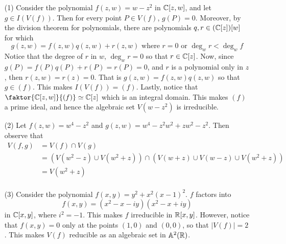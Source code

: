 \begin{example}\label{example_1.12}
    \begin{enumerate}
        \item[(1)] Consider the polynomial $f(z,w)=w-z^2$ in $\mathbb{C}[z,w]$, and let
            $g \in I(V(f))$. Then for every point $P \in V(f)$, $g(P)=0$.
            Moreover, by the division theorem for polynomials, there
            are polynomials $q,r \in
            (\mathbb{C}[z])[w]$ for which
            \begin{equation*}
                g(z,w)=f(z,w)q(z,w)+r(z,w) \text{ where } r=0 \text{ or }
                \deg_w{r} < \deg_w{f}
            \end{equation*}
            Notice that the degree of $r$ in  $w$,  $\deg_w{r}=0$ so that $r \in
            \mathbb{C}[z]$. Now, since $g(P)=f(P)q(P)+r(P)=r(P)=0$, and $r$ is a
            polynomial only in $z$, then $r(z,w)=r(z)=0$. That is
            $g(z,w)=f(z,w)q(z,w)$ so that $g \in (f)$. This makes $I(V(f))=(f)$.
            Lastly, notice that $\faktor{\C[z,w]}{(f)} \simeq \C[z]$ which is an
            integral domain. This makes $(f)$ a prime ideal, and hence the
            algebraic set $V(w-z^2)$ is irreducible.

        \item[(2)] Let $f(z,w)=w^4-z^2$ and $g(z,w)=w^4-z^2w^2+zw^2-z^2$. Then
            observe that
            \begin{align*}
                V(f,g)  &= V(f) \cap V(g) \\
                        &=  (V(w^2-z) \cup V(w^2+z)) \cap
                                (V(w+z) \cup V(w-z) \cup V(w^2+z)) \\
                        &= V(w^2+z) \\
            \end{align*}

        \item[(3)] Consider the polynomial $f(x,y)=y^2+x^2(x-1)^2$. $f$ factors
            into
            \begin{equation*}
                f(x,y)=(x^2-x-iy)(x^2-x+iy)
            \end{equation*}
            in $\mathbb{C}[x,y]$, where $i^2=-1$. This makes $f$ irreducible in $\mathbb{R}[x,y]$.
            However, notice that $f(x,y)=0$ only at the points $(1,0)$ and
            $(0,0)$, so that $|V(f)|=2$. This makes $V(f)$ reducible as an
            algebraic set in $\mathbb{A}^2(\mathbb{R})$.
    \end{enumerate}
\end{example}

